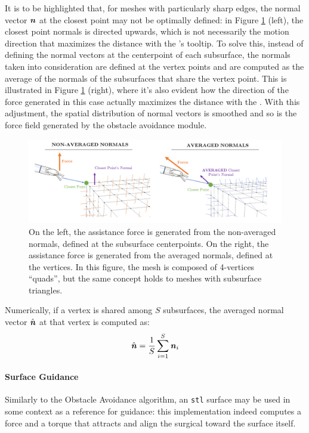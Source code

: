 \documentclass[../main.tex]{subfiles}
\begin{document}
It is to be highlighted that, for meshes with particularly sharp edges, the normal vector $\textbf{\textit{n}}$ at the closest point may not be optimally defined: in Figure \ref{fig:normalsaveraging} (left), the closest point normals is directed upwards, which is not necessarily the motion direction that maximizes the distance with the \psm's tooltip. To solve this, instead of defining the normal vectors at the centerpoint of each subsurface, the normals taken into consideration are defined at the vertex points and are computed as the average of the normals of the subsurfaces that share the vertex point. This is illustrated in Figure \ref{fig:normalsaveraging} (right), where it's also evident how the direction of the force generated in this case actually maximizes the distance with the \ee. With this adjustment, the spatial distribution of normal vectors is smoothed and so is the force field generated by the obstacle avoidance module.
\begin{figure}
    \centering
    \includegraphics[width=\textwidth]{images/normals_averaging.png}
    \caption{On the left, the assistance force is generated from the non-averaged normals, defined at the subsurface centerpoints. On the right, the assistance force is generated from the averaged normals, defined at the vertices. In this figure, the mesh is composed of 4-vertices ``quads'', but the same concept holds to meshes with subsurface triangles.}
    \label{fig:normalsaveraging}
\end{figure}
Numerically, if a vertex is shared among $S$ subsurfaces, the averaged normal vector $\hat{\textbf{\textit{n}}}$ at that vertex is computed as:
\begin{equation}
    \hat{\textbf{\textit{n}}} = \frac{1}{S}\sum_{i=1}^{S} \textbf{\textit{n}}_i
    \label{eq:normalsaveraging}
\end{equation}


\paragraph{Surface Guidance} Similarly to the Obstacle Avoidance algorithm, an \texttt{stl} surface may be used in some context as a reference for guidance: this implementation indeed computes a force and a torque that attracts and align the surgical \ee toward the surface itself. 
\end{document}
